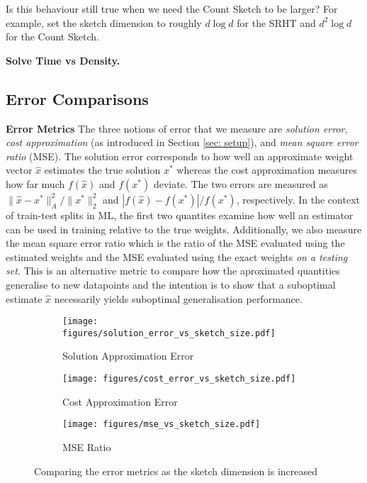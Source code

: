 Is this behaviour still true when we need the Count Sketch to be larger?
For example, set the sketch dimension to roughly $d \log d$ for the SRHT and
$d^2 \log d$ for the Count Sketch.

\noindent
\textbf{Solve Time vs Density.}


\subsection{Error Comparisons}
\textbf{Error Metrics}
The three notions of error that we measure are \textit{solution error},
\textit{cost approximation} (as introduced in Section \ref{sec: setup}), and
\textit{mean square error ratio} (MSE).
The solution error corresponds to how well an approximate weight vector
$\hat{x}$ estimates the true solution $x^*$ whereas the cost approximation
measures how far much $f(\hat{x})$ and $f(x^*)$ deviate.
The two errors are measured as $\| \hat{x} - x^* \|_A^2/\|x^*\|_2^2$ and
$|f(\hat{x}) - f(x^*)|/f(x^*)$, respectively.
In the context of train-test splits in ML, the first two quantites examine how
well an estimator can be used in training relative to the true weights.
Additionally, we also measure the mean square error ratio which is the ratio of
the MSE evaluated using the estimated weights and the MSE evaluated using the
exact weights \textit{on a testing set}.
This is an alternative metric to compare how the aproximated
quantities generalise to new datapoints and the intention is to show that a
suboptimal estimate $\hat{x}$ necessarily yields suboptimal generalisation
performance.



\begin{figure}[H]
    \centering
    \begin{subfigure}{0.33\textwidth}
    \centering
        \texttt{[image: figures/solution\_error\_vs\_sketch\_size.pdf]}
        \caption{Solution Approximation Error}
        \label{fig: soln-error}
    \end{subfigure}%
    \begin{subfigure}{0.33\textwidth}
    \centering
        \texttt{[image: figures/cost\_error\_vs\_sketch\_size.pdf]}
        \caption{Cost Approximation Error}
        \label{fig: cost-error}
    \end{subfigure}
    \begin{subfigure}{0.33\textwidth}
    \centering
        \texttt{[image: figures/mse\_vs\_sketch\_size.pdf]}
        \caption{MSE Ratio}
        \label{fig: mse-ratio}
    \end{subfigure}
    \caption{Comparing the error metrics as the sketch dimension is increased}
    \label{fig: error-vs-sketch-synthetic}
    \end{figure}

